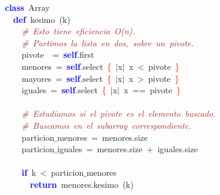 \noindent
\mbox{}\textbf{\textcolor{Blue}{class}}\ Array \\
\mbox{}\ \ \textbf{\textcolor{Blue}{def}}\ kesimo\ \textcolor{BrickRed}{(}k\textcolor{BrickRed}{)} \\
\mbox{}\ \ \ \ \textit{\textcolor{Brown}{\#\ Esto\ tiene\ eficiencia\ O(n).}} \\
\mbox{}\ \ \ \ \textit{\textcolor{Brown}{\#\ Partimos\ la\ lista\ en\ dos,\ sobre\ un\ pivote.}} \\
\mbox{}\ \ \ \ pivote\ \ \textcolor{BrickRed}{=}\ \textbf{\textcolor{Blue}{self}}\textcolor{BrickRed}{.}first \\
\mbox{}\ \ \ \ menores\ \textcolor{BrickRed}{=}\ \textbf{\textcolor{Blue}{self}}\textcolor{BrickRed}{.}select\ \textcolor{Red}{\{}\ \textcolor{BrickRed}{$|$}x\textcolor{BrickRed}{$|$}\ x\ \textcolor{BrickRed}{\textless{}}\ pivote\ \textcolor{Red}{\}} \\
\mbox{}\ \ \ \ mayores\ \textcolor{BrickRed}{=}\ \textbf{\textcolor{Blue}{self}}\textcolor{BrickRed}{.}select\ \textcolor{Red}{\{}\ \textcolor{BrickRed}{$|$}x\textcolor{BrickRed}{$|$}\ x\ \textcolor{BrickRed}{\textgreater{}}\ pivote\ \textcolor{Red}{\}} \\
\mbox{}\ \ \ \ iguales\ \textcolor{BrickRed}{=}\ \textbf{\textcolor{Blue}{self}}\textcolor{BrickRed}{.}select\ \textcolor{Red}{\{}\ \textcolor{BrickRed}{$|$}x\textcolor{BrickRed}{$|$}\ x\ \textcolor{BrickRed}{==}\ pivote\ \textcolor{Red}{\}} \\
\mbox{} \\
\mbox{}\ \ \ \ \textit{\textcolor{Brown}{\#\ Estudiamos\ si\ el\ pivote\ es\ el\ elemento\ buscado.}} \\
\mbox{}\ \ \ \ \textit{\textcolor{Brown}{\#\ Buscamos\ en\ el\ subarray\ correspondiente.}} \\
\mbox{}\ \ \ \ particion$\_$menores\ \textcolor{BrickRed}{=}\ menores\textcolor{BrickRed}{.}size \\
\mbox{}\ \ \ \ particion$\_$iguales\ \textcolor{BrickRed}{=}\ menores\textcolor{BrickRed}{.}size\ \textcolor{BrickRed}{+}\ iguales\textcolor{BrickRed}{.}size \\
\mbox{} \\
\mbox{}\ \ \ \ \textbf{\textcolor{Blue}{if}}\ k\ \textcolor{BrickRed}{\textless{}}\ particion$\_$menores \\
\mbox{}\ \ \ \ \ \ \textbf{\textcolor{Blue}{return}}\ menores\textcolor{BrickRed}{.}kesimo\ \textcolor{BrickRed}{(}k\textcolor{BrickRed}{)} \\
